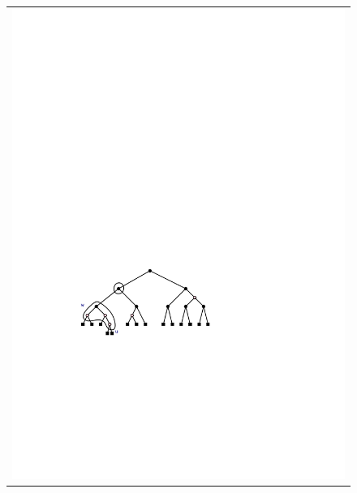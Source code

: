 \begin{figure}
\begin{center}
\begin{tabular}{c}
			\includegraphics[scale=0.90909]{figs/rb-split-2} \\

\end{tabular}
\end{center}
\end{figure}
